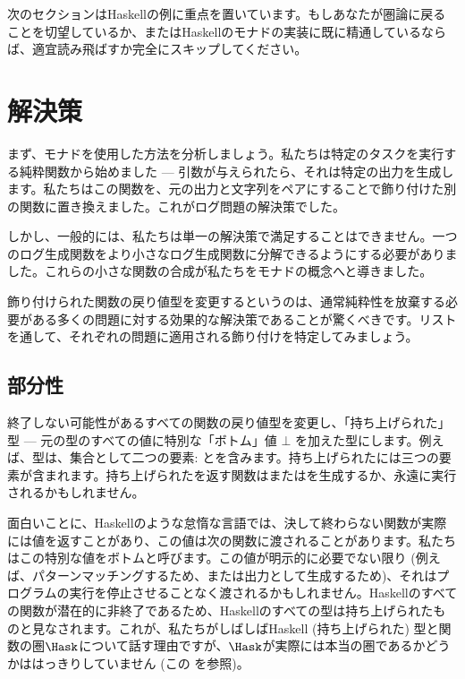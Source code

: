次のセクションはHaskellの例に重点を置いています。もしあなたが圏論に戻ることを切望しているか、またはHaskellのモナドの実装に既に精通しているならば、適宜読み飛ばすか完全にスキップしてください。

\section{解決策}

まず、モナドを使用した方法を分析しましょう。私たちは特定のタスクを実行する純粋関数から始めました --- 引数が与えられたら、それは特定の出力を生成します。私たちはこの関数を、元の出力と文字列をペアにすることで飾り付けた別の関数に置き換えました。これがログ問題の解決策でした。

しかし、一般的には、私たちは単一の解決策で満足することはできません。一つのログ生成関数をより小さなログ生成関数に分解できるようにする必要がありました。これらの小さな関数の合成が私たちをモナドの概念へと導きました。

飾り付けられた関数の戻り値型を変更するというのは、通常純粋性を放棄する必要がある多くの問題に対する効果的な解決策であることが驚くべきです。リストを通して、それぞれの問題に適用される飾り付けを特定してみましょう。

\subsection{部分性}

終了しない可能性があるすべての関数の戻り値型を変更し、「持ち上げられた」型 --- 元の型のすべての値に特別な「ボトム」値 $\bot$ を加えた型にします。例えば、型は、集合として二つの要素: とを含みます。持ち上げられたには三つの要素が含まれます。持ち上げられたを返す関数はまたはを生成するか、永遠に実行されるかもしれません。

面白いことに、Haskellのような怠惰な言語では、決して終わらない関数が実際には値を返すことがあり、この値は次の関数に渡されることがあります。私たちはこの特別な値をボトムと呼びます。この値が明示的に必要でない限り (例えば、パターンマッチングするため、または出力として生成するため)、それはプログラムの実行を停止させることなく渡されるかもしれません。Haskellのすべての関数が潜在的に非終了であるため、Haskellのすべての型は持ち上げられたものと見なされます。これが、私たちがしばしばHaskell (持ち上げられた) 型と関数の圏$\Hask$について話す理由ですが、$\Hask$が実際には本当の圏であるかどうかははっきりしていません (この
を参照)。

